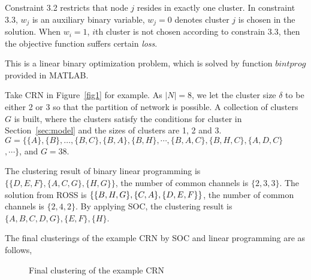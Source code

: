 Constraint 3.2 restricts that node $j$ resides in exactly one cluster. %
In constraint 3.3, $w_j$ is an auxiliary binary variable, $w_j=0$ denotes cluster $j$ is chosen in the solution.
When $w_i=1$, $i$th cluster is not chosen according to constrain 3.3, then the objective function suffers certain \textit{loss}.











This is a linear binary optimization problem, which is solved by function $bintprog$ provided in MATLAB.


Take CRN in Figure~\ref{fig1} for example.
As $|N|=8$, we let the cluster size $\delta$ to be either 2 or 3 so that the partition of network is possible.
A collection of clusters $G$ is built, where the clusters satisfy the conditions for cluster in Section~\ref{sec:model} and the sizes of clusters are 1, 2 and 3. 
$G=\{\{A\}, \{B\},\dots,\{B,C\},\{B,A\},\{B,H\},\cdots,\{B,A,C\},\{B,H,C\}, \{A,D,C\}$\\$,\cdots\}$, and $G=38$.

The clustering result of binary linear programming is $\{\{D,E,F\},\{A,C,G\},\{H,G\}\}$, the number of common channels is $\{2,3,3\}$.
The solution from ROSS is $\newline \{\{B,H,G\},\{C,A\},\{D,E,F\}\}$, the number of common channels is $\{2,4,2\}$.
By applying SOC, the clustering result is $\{A,B,C,D,G\},\{E,F\},\{H\}$.

The final clusterings of the example CRN by SOC and linear programming are as follows,

\begin{figure}[ht]
\begin{center}
%
\end{center}
\caption{Final clustering of the example CRN}
\label{fig:final_clustering}
\end{figure}

